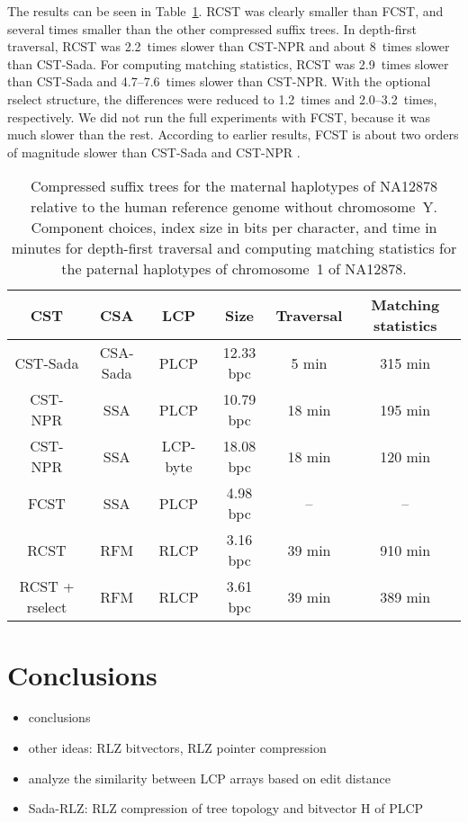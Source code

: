 \documentclass[a4paper,11pt]{llncs}
\newcommand{\CST}{\textsf{CST}}
\newcommand{\CSTsada}{\textsf{CST\nobreakdash-Sada}}
\newcommand{\FCST}{\textsf{FCST}}
\newcommand{\CSTnpr}{\textsf{CST\nobreakdash-NPR}}
\newcommand{\RCST}{\textsf{RCST}}
\newcommand{\CSA}{\textsf{CSA}}
\newcommand{\SSA}{\textsf{SSA}}
\newcommand{\CSAsada}{\textsf{CSA-Sada}}
\newcommand{\RFM}{\textsf{RFM}}
\newcommand{\LCP}{\textsf{LCP}}
\newcommand{\PLCP}{\textsf{PLCP}}
\newcommand{\RLCP}{\textsf{RLCP}}
\newcommand{\LCPbyte}{\textsf{LCP\nobreakdash-byte}}
\newcommand{\rselect}{\textsf{rselect}}
\begin{document}
The results can be seen in Table~\ref{table:cst}. \RCST{} was clearly smaller
than \FCST, and several times smaller than the other compressed suffix trees.
In depth-first traversal, \RCST{} was 2.2~times slower than \CSTnpr{} and
about 8~times slower than \CSTsada. For computing matching statistics, \RCST{}
was 2.9~times slower than \CSTsada{} and 4.7\nobreakdash--7.6~times slower
than \CSTnpr{}. With the optional \rselect{} structure, the differences were
reduced to 1.2~times and 2.0\nobreakdash--3.2~times, respectively. We did not
run the full experiments with \FCST, because it was much slower than the rest.
According to earlier results, \FCST{} is about two orders of magnitude slower
than \CSTsada{} and \CSTnpr{} \cite{Abeliuk2013}.

\begin{table}
\caption{Compressed suffix trees for the maternal haplotypes of NA12878
relative to the human reference genome without chromosome~Y. Component
choices, index size in bits per character, and time in minutes for depth-first
traversal and computing matching statistics for the paternal haplotypes of
chromosome~1 of NA12878.}\label{table:cst}
\setlength{\extrarowheight}{2pt}
\setlength{\tabcolsep}{3pt}
\begin{center}
\begin{tabular}{c|cc|c|c|c}
\hline
\textbf{\CST} & \textbf{\CSA} & \textbf{\LCP} & \textbf{Size} &
\textbf{Traversal} & \textbf{Matching statistics} \\
\hline
\CSTsada           & \CSAsada & \PLCP    & 12.33 bpc &  5 min & 315 min \\
\CSTnpr            & \SSA     & \PLCP    & 10.79 bpc & 18 min & 195 min \\
\CSTnpr            & \SSA     & \LCPbyte & 18.08 bpc & 18 min & 120 min \\
\FCST              & \SSA     & \PLCP    &  4.98 bpc &     -- &      -- \\
\RCST              & \RFM     & \RLCP    &  3.16 bpc & 39 min & 910 min \\
\RCST{} + \rselect & \RFM     & \RLCP    &  3.61 bpc & 39 min & 389 min \\
\hline
\end{tabular}
\end{center}
\end{table}


\section{Conclusions}\label{section:conclusions}

\begin{itemize}
\item conclusions
\item other ideas: RLZ bitvectors, RLZ pointer compression
\item analyze the similarity between LCP arrays based on edit distance
\item Sada-RLZ: RLZ compression of tree topology and bitvector H of PLCP
\end{itemize}




\end{document}
